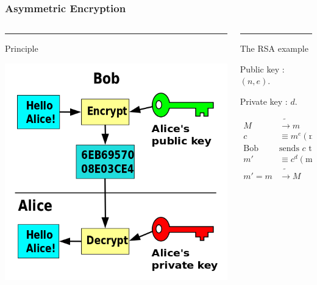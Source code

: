 \documentclass[12pt]{beamer}
\begin{document}
\begin{frame}
    \frametitle{Asymmetric Encryption}
    \begin{columns}[T]
        \begin{column}{.48\textwidth}
            {\color{blue}\rule{\linewidth}{4pt}

            Principle}
            \includegraphics[width=\linewidth]{public-key.png}
        \end{column}
        \hfill
        \begin{column}{.48\linewidth}
            {\color{green!40!black}\rule{\linewidth}{4pt}

            The RSA example}

            Public key : $(n,e)$.

            Private key : $d$.

            \begin{align*}
                M & \tilde{\longrightarrow} m \\
                c &\equiv m^e (\text{mod } n) \\
                \text{Bob } & \text{sends $c$ to Alice} \\
                m' &\equiv c^d (\text{mod } n) \\
                m' = m &\tilde{\longrightarrow} M\\
            \end{align*}
        \end{column}
    \end{columns}
\end{frame}
\end{document}

